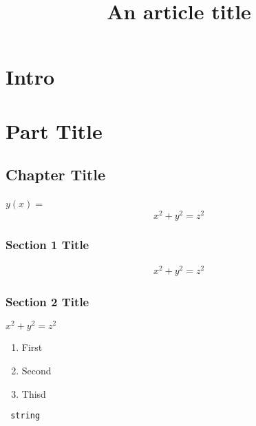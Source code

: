 \documentclass[11pt,epsfig]{article=2, test=10}
\title{An article title}
\begin{document}
\part*{Intro}

\part{Part Title}
\chapter{Chapter Title}


\begin{problem}{0}
  $\displaystyle y(x)= $ \
  \begin{equation}
     x^2 + y^2 = z^2
  \end{equation}
\end{problem}


\section{Section 1 Title}

\begin{align*}
  x^2 + y^2 = z^2
\end{align*}

\section{Section 2 Title}
 
$x^2 + y^2 = z^2$
\begin{enumerate}
    \item First
    \item Second
    \item Thisd
\end{enumerate}

\verb| string|
\end{document}
